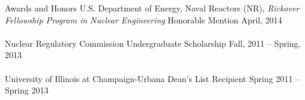 \documentclass{resume} %
\begin{document}
\begin{rSection}{Awards and Honors}
U.S. Department of Energy, Naval Reactors (NR), {\it Rickover Fellowship Program in Nuclear Engineering} Honorable Mention \hfill {April, 2014} 
\\
\\
{ Nuclear Regulatory Commission Undergraduate Scholarship} \hfill {Fall, 2011 -- Spring, 2013}
\\
\\
University of Illinois at Champaign-Urbana Dean's List Recipient \hfill{Spring 2011 -- Spring 2013}
\end{rSection}





\end{document}
